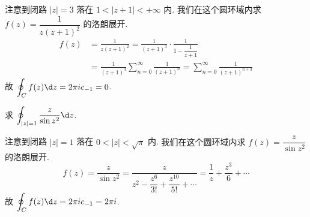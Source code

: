 \begin{solution}
	注意到闭路 $|z|=3$ 落在 $1<|z+1|<+\infty$ 内.
	{我们在这个圆环域内求 $f(z)=\dfrac1{z(z+1)^2}$ 的洛朗展开.
		\begin{align*}
		f(z)&=\frac1{z(z+1)^2}=\frac1{(z+1)^3}\cdot\frac1{1-\dfrac1{z+1}}\\
		&{=\frac1{(z+1)^3}\sum_{n=0}^\infty\frac1{(z+1)^n}}
		{=\sum_{n=0}^{\infty}\frac1{(z+1)^{n+3}}}
		\end{align*}故
		$\displaystyle\oint_Cf(z)\d z=2\pi i c_{-1}=0$.}
\end{solution}
% 

\begin{example}
	求 $\displaystyle\oint_{|z|=1}\frac{z}{\sin z^2}\d z$.
\end{example}

\begin{solution}
	注意到闭路 $|z|=1$ 落在 $0<|z|<\sqrt \pi$ 内.
	{我们在这个圆环域内求 $f(z)=\dfrac{z}{\sin z^2}$ 的洛朗展开.
		\[
		f(z)=\frac{z}{\sin z^2}=
		\frac{z}{z^2-\dfrac{z^6}{3!}+\dfrac{z^{10}}{5!}+\cdots}
		{=\frac1z+\frac{z^3}6+\cdots}
		\]故
		$\displaystyle\oint_Cf(z)\d z=2\pi i c_{-1}=2\pi i$.}
\end{solution}






